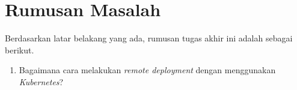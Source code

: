 \section{Rumusan Masalah}

Berdasarkan latar belakang yang ada, rumusan tugas akhir ini adalah sebagai berikut.
\begin{enumerate}
  \item Bagaimana cara melakukan \textit{remote deployment} dengan menggunakan \textit{Kubernetes}?
\end{enumerate}